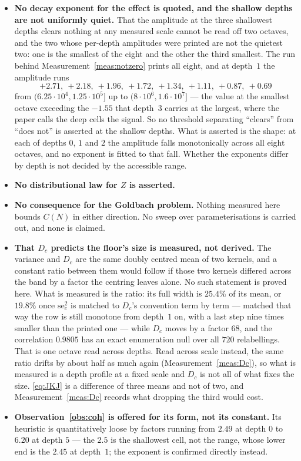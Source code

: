 \documentclass[11pt,a4paper]{article}
\theoremstyle{plain}
\theoremstyle{definition}
\theoremstyle{remark}
\begin{document}
\begin{itemize}
\item \textbf{No decay exponent for the effect is quoted, and the
shallow depths are not uniformly quiet.} That the amplitude at the
three shallowest depths clears nothing at any measured scale cannot be
read off two octaves, and the two whose per-depth amplitudes were
printed are not the quietest two: one is the smallest of the eight and
the other the third smallest.
The run behind Measurement~\ref{meas:notzero} prints all eight, and at
depth~$1$ the amplitude runs
\[
  +2.71,\ +2.18,\ +1.96,\ +1.72,\ +1.34,\ +1.11,\ +0.87,\ +0.69
\]
from $(6.25\cdot10^4,1.25\cdot10^5]$ up to
$(8\cdot10^6,1.6\cdot10^7]$ --- the value at the smallest octave
exceeding the $-1.55$ that depth~$3$ carries at the largest, where the
paper calls the deep cells the signal. So no threshold separating
``clears'' from ``does not'' is asserted at the shallow depths. What
is asserted is the shape: at each of depths $0$, $1$ and $2$ the
amplitude falls monotonically across all eight octaves, and no
exponent is fitted to that fall. Whether the exponents differ by depth
is not decided by the accessible range.
\item \textbf{No distributional law for $Z$ is asserted.}
\item \textbf{No consequence for the Goldbach problem.} Nothing
measured here bounds $C(N)$ in either direction. No sweep over
parameterisations is carried out, and none is claimed.
\item \textbf{That $D_c$ predicts the floor's size is measured, not
derived.} The variance and $D_c$ are the same doubly centred mean of
two kernels, and a constant ratio between them would follow if those
two kernels differed across the band by a factor the centring leaves
alone. No such statement is proved here. What is measured is the
ratio: its full width is $25.4\%$ of its mean, or $19.8\%$ once
$\mathrm{se}_c^2$ is matched to $D_c$'s convention term by term ---
matched that way the row is still monotone from depth~$1$ on, with a
last step nine times smaller than the printed one --- while
$D_c$ moves by a factor $68$, and the correlation $0.9805$ has an exact enumeration null over
all $720$ relabellings. That is one octave read across depths.
Read across scale instead, the same ratio drifts by about half as much
again (Measurement~\ref{meas:Dc}), so what is measured is a depth profile at
a fixed scale and $D_c$ is not all of what fixes the size.
\eqref{eq:JKJ} is a difference of three means and not of two, and
Measurement~\ref{meas:Dc} records what dropping the third would cost.
\item \textbf{Observation~\ref{obs:coh} is offered for its form, not
its constant.} Its heuristic is quantitatively loose by factors
running from $2.49$ at depth $0$ to $6.20$ at depth $5$ --- the $2.5$
is the shallowest cell, not the range, whose lower end is the $2.45$
at depth~$1$; the exponent is confirmed
directly instead.


\end{itemize}
\end{document}
